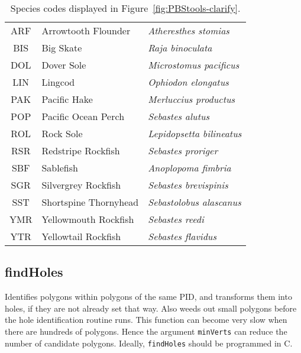 \documentclass[letterpaper,12pt,fleqn]{article}
\def\tab{\hspace{0.5 in}}
\newcommand\tstrut{\rule{0pt}{2.4ex}}         %
\newcommand\bstrut{\rule[-1.0ex]{0pt}{0pt}}   %
\newcommand{\code}[1]{\small\texttt{#1}\normalsize}
\begin{document}
\begin{table}[ht!]
  \vspace{6pt}\caption{Species codes displayed in Figure~\ref{fig:PBStools-clarify}.}\vspace{-6pt}
  \begin{center}
    \begin{tabular}{cll}
    \hline 
ARF & Arrowtooth Flounder   & \emph{Atheresthes stomias} \tstrut \\ 
BIS & Big Skate             & \emph{Raja binoculata} \\
DOL & Dover Sole            & \emph{Microstomus pacificus} \\
LIN & Lingcod               & \emph{Ophiodon elongatus} \\
PAK & Pacific Hake          & \emph{Merluccius productus} \\
POP & Pacific Ocean Perch   & \emph{Sebastes alutus} \\
ROL & Rock Sole             & \emph{Lepidopsetta bilineatus} \\
RSR & Redstripe Rockfish    & \emph{Sebastes proriger} \\ 
SBF & Sablefish             & \emph{Anoplopoma fimbria} \\
SGR & Silvergrey Rockfish   & \emph{Sebastes brevispinis} \\
SST & Shortspine Thornyhead & \emph{Sebastolobus alascanus} \\
YMR & Yellowmouth Rockfish  & \emph{Sebastes reedi} \\
YTR & Yellowtail Rockfish   & \emph{Sebastes flavidus}  \bstrut \\
    \hline 
    \end{tabular}
  \end{center}
  \label{tab:PBStools-clarify}
\end{table}

\subsection {findHoles}

\tab Identifies polygons within polygons of the same PID, and transforms them into holes, if they are not already set that way. Also weeds out small polygons before the hole identification routine runs. This function can become very slow when there are hundreds of polygons. Hence the argument \code{minVerts} can reduce the number of candidate polygons. Ideally, \code{findHoles} should be programmed in C.
\end{document}
